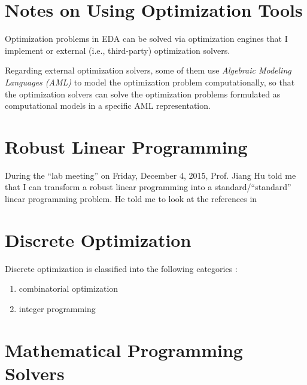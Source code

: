 \section{Notes on Using Optimization Tools}
\label{sec:NotesonUsingOptimizationTools}


Optimization problems in EDA can be solved via optimization engines that I implement or external (i.e., third-party) optimization solvers.

Regarding external optimization solvers, some of them use {\it Algebraic Modeling Languages (AML)} \cite{WikipediaContributors2015i} to model the optimization problem computationally, so that the optimization solvers can solve the optimization problems formulated as computational models in a specific AML representation.



\section{Robust Linear Programming}
\label{sec:RobustLinearProgramming}


During the ``lab meeting'' on Friday, December 4, 2015, Prof. Jiang Hu told me that I can transform a robust linear programming into a standard/``standard'' linear programming problem. He told me to look at the references in 




\section{Discrete Optimization}
\label{sec:DiscreteOptimization}

Discrete optimization is classified into the following categories \cite{WikipediaContributors2015h,Hammer1979,Lee2004c}: \vspace{-0.3cm}
\begin{enumerate} \itemsep -4pt
\item combinatorial optimization
\item integer programming
\end{enumerate}








\section{Mathematical Programming Solvers}
\label{sec:MathematicalProgrammingSolvers}

